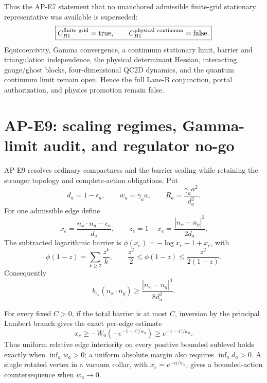 \documentclass[11pt]{article}
\numberwithin{equation}{section}
\begin{document}
Thus the AP-E7 statement that no unanchored admissible finite-grid stationary
representative was available is superseded:
\begin{equation}
 \boxed{C_{B1}^{\rm finite\ grid}=\mathrm{true},\qquad
 C_{B1}^{\rm physical\ continuum}=\mathrm{false}.}
 \label{eq:e8-decision}
\end{equation}
Equicoercivity, Gamma convergence, a continuum stationary limit, barrier and
triangulation independence, the physical determinant Hessian, interacting
gauge/ghost blocks, four-dimensional QC2D dynamics, and the quantum continuum
limit remain open.  Hence the full Lane-B conjunction, portal authorization,
and physics promotion remain false.

\section{AP-E9: scaling regimes, Gamma-limit audit, and regulator no-go}

AP-E9 resolves ordinary compactness and the barrier scaling while retaining
the stronger topology and complete-action obligations.  Put
\begin{equation}
 d_a=1-\epsilon_a,\qquad w_a=\gamma_a a,\qquad
 R_a=\frac{\gamma_a a^2}{d_a^2}.
 \label{eq:e9-scales}
\end{equation}
For one admissible edge define
\begin{equation}
 x_e=\frac{n_x\cdot n_y-\epsilon_a}{d_a},\qquad
 z_e=1-x_e=\frac{|n_x-n_y|^2}{2d_a}.
\end{equation}
The subtracted logarithmic barrier is
$\phi(x_e)=-\log x_e-1+x_e$, with
\begin{equation}
 \phi(1-z)=\sum_{k\ge2}\frac{z^k}{k},\qquad
 \frac{z^2}{2}\le\phi(1-z)\le\frac{z^2}{2(1-z)}.
\end{equation}
Consequently
\begin{equation}
 \boxed{b_{\epsilon_a}(n_x\cdot n_y)
 \ge\frac{|n_x-n_y|^4}{8d_a^2}.}
 \label{eq:e9-quartic-bound}
\end{equation}

For every fixed $C>0$, if the total barrier is at most $C$, inversion by the
principal Lambert
branch gives the exact per-edge estimate
\begin{equation}
 x_e\ge -W_0(-e^{-1-C/w_a})
 \ge e^{-1-C/w_a}.
 \label{eq:e9-lambert}
\end{equation}
Thus uniform relative edge interiority on every positive bounded sublevel
holds exactly
when $\inf_a w_a>0$; a uniform absolute margin also requires
$\inf_a d_a>0$.  A single rotated vertex in a vacuum collar, with
$x_e=e^{-\alpha/w_a}$, gives a bounded-action countersequence when
$w_a\to0$.
\end{document}
